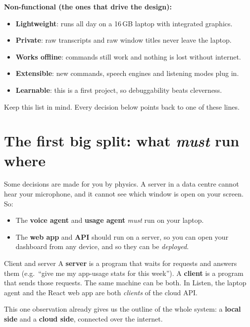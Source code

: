\documentclass[11pt,a4paper]{article}
\begin{document}
\noindent\textbf{Non-functional (the ones that drive the design):}
\begin{itemize}[nosep]
  \item \textbf{Lightweight}: runs all day on a 16\,GB laptop with integrated graphics.
  \item \textbf{Private}: raw transcripts and raw window titles never leave the laptop.
  \item \textbf{Works offline}: commands still work and nothing is lost without internet.
  \item \textbf{Extensible}: new commands, speech engines and listening modes plug in.
  \item \textbf{Learnable}: this is a first project, so debuggability beats cleverness.
\end{itemize}

Keep this list in mind. Every decision below points back to one of these lines.

\section{The first big split: what \emph{must} run where}

Some decisions are made for you by physics. A server in a data centre cannot hear your
microphone, and it cannot see which window is open on your screen. So:

\begin{itemize}
  \item The \textcolor{local}{\textbf{voice agent}} and \textcolor{local}{\textbf{usage agent}}
        \emph{must} run on your laptop.
  \item The \textcolor{cloud}{\textbf{web app}} and \textcolor{cloud}{\textbf{API}} should run
        on a server, so you can open your dashboard from any device, and so they can be
        \emph{deployed}.
\end{itemize}

\begin{concept}{Client and server}
A \textbf{server} is a program that waits for requests and answers them (e.g.\ ``give me my
app-usage stats for this week''). A \textbf{client} is a program that sends those requests.
The same machine can be both. In Listen, the laptop agent and the React web app are both
\emph{clients} of the cloud API.
\end{concept}

This one observation already gives us the outline of the whole system: a \textbf{local
side} and a \textbf{cloud side}, connected over the internet.
\end{document}
